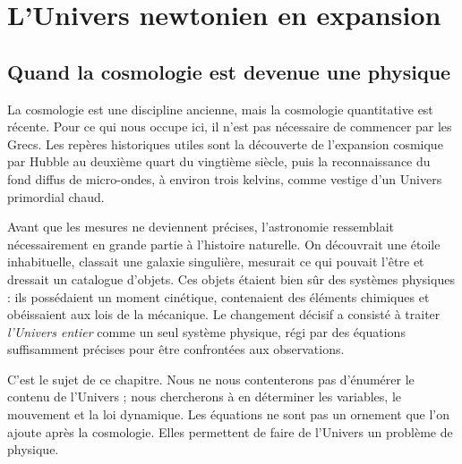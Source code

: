 \chapter{L’Univers newtonien en expansion}


\section{Quand la cosmologie est devenue une physique}

La cosmologie est une discipline ancienne, mais la cosmologie quantitative est récente. Pour ce qui nous occupe ici, il n’est pas nécessaire de commencer par les Grecs. Les repères historiques utiles sont la découverte de l’expansion cosmique par Hubble au deuxième quart du vingtième siècle, puis la reconnaissance du fond diffus de micro-ondes, à environ trois kelvins, comme vestige d’un Univers primordial chaud.

Avant que les mesures ne deviennent précises, l’astronomie ressemblait nécessairement en grande partie à l’histoire naturelle. On découvrait une étoile inhabituelle, classait une galaxie singulière, mesurait ce qui pouvait l’être et dressait un catalogue d’objets. Ces objets étaient bien sûr des systèmes physiques : ils possédaient un moment cinétique, contenaient des éléments chimiques et obéissaient aux lois de la mécanique. Le changement décisif a consisté à traiter \emph{l’Univers entier} comme un seul système physique, régi par des équations suffisamment précises pour être confrontées aux observations.

C’est le sujet de ce chapitre. Nous ne nous contenterons pas d’énumérer le contenu de l’Univers ; nous chercherons à en déterminer les variables, le mouvement et la loi dynamique. Les équations ne sont pas un ornement que l’on ajoute après la cosmologie. Elles permettent de faire de l’Univers un problème de physique.


